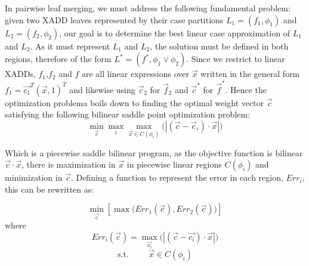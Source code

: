 In pairwise leaf merging, we must address the following fundamental
problem: given two XADD leaves represented by their case partitions
$L_1 = ( f_1, \phi_1 )$ and $L_2 = ( f_2, \phi_2 )$, our goal is to
determine the best linear case approximation of $L_1$ and $L_2$.  As
it must represent $L_1$ and $L_2$, the solution must be defined in
both regions, therefore of the form $L^* = (f^*,\phi_1 \lor \phi_2)$.
Since we restrict to linear XADDs, $f_1$,$f_2$ and $f$ are all linear
expressions over $\vec{x}$ written in the general form $f_1
= \vec{c_1}^T (\vec{x},1)^T$ and likewise using $\vec{c}_2$ for $\vec{f}_2$
and $\vec{c}^*$ for $\vec{f}^*$.  Hence the optimization problema
boils down to finding the optimal weight vector $\vec{c}$ satisfying
the following bilinear saddle point optimization problem:
\begin{equation} \min_{\vec{c}} \max_{i} \max_{\vec{x} \in C(\phi_i)} \big( |(\vec{c} - \vec{c}_i)\cdot \vec{x}| \big)  \label{eq:optimglo} \end{equation}


Which is a piecewise saddle bilinear program, as the objective
function is bilinear $\vec{c} \cdot \vec{x}$, there is maximization in
$\vec{x}$ in piecewise linear regions $C(\phi_i)$ and minimization in
$\vec{c}$. Defining a function to represent the error in each region,
$Err_i$, this can be rewritten as:

\begin{equation} \min_{\vec{c}} \left[ \max \big( Err_1(\vec{c}), Err_2(\vec{c}) \big) \right] \label{eq:minc} \end{equation}
where
\begin{equation} Err_i(\vec{c}) = \max_{\vec{x_i}} \big(  | (\vec{c}-\vec{c_i}) \cdot \vec{x} |\big) \label{eq:errc} \end
{equation}
$$\text{s.t.} \hspace{1cm} \vec{x} \in C(\phi_i)$$

